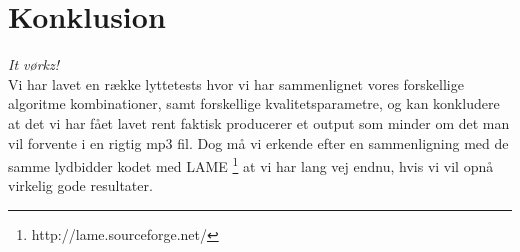 \section{Konklusion}
\textit{It vørkz!}\\
Vi har lavet en række lyttetests hvor vi har sammenlignet vores
forskellige algoritme kombinationer, samt forskellige
kvalitetsparametre, og kan konkludere at det vi har fået lavet rent
faktisk producerer et output som minder om det man vil forvente i en
rigtig mp3 fil. Dog må vi erkende efter en sammenligning med de samme
lydbidder kodet med LAME \footnote{http://lame.sourceforge.net/} at vi
har lang vej endnu, hvis vi vil opnå virkelig gode resultater.
